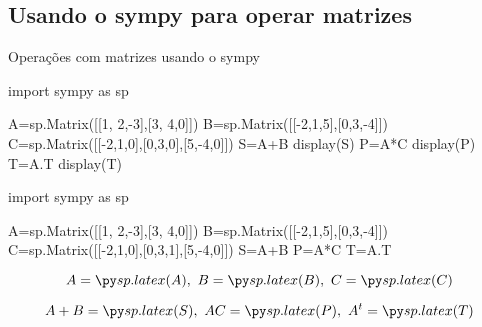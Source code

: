 \subsection*{Usando o sympy para operar matrizes}



\begin{frame}[label=matrizes,fragile=singleslide]{Operações com matrizes usando o sympy}
	\begin{footnotesize}
\begin{pyverbatim}
import sympy as sp

A=sp.Matrix([[1, 2,-3],[3, 4,0]])
B=sp.Matrix([[-2,1,5],[0,3,-4]])
C=sp.Matrix([[-2,1,0],[0,3,0],[5,-4,0]])
S=A+B
display(S)
P=A*C
display(P)
T=A.T
display(T)

\end{pyverbatim}
	\end{footnotesize}		
\begin{pycode}
import sympy as sp

A=sp.Matrix([[1, 2,-3],[3, 4,0]])
B=sp.Matrix([[-2,1,5],[0,3,-4]])
C=sp.Matrix([[-2,1,0],[0,3,1],[5,-4,0]])
S=A+B
P=A*C
T=A.T
\end{pycode}
\[A=\pyl{A},\ B=\pyl{B},\ C=\pyl{C}\]

\[A+B=\pyl{S},\ AC=\pyl{P},\ A^t=\pyl{T}\]

\end{frame}





